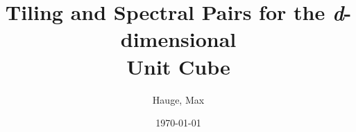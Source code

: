 
\author{Hauge, Max}


\newif\ifSINGLESUPERVISOR
\SINGLESUPERVISORfalse  %

\ifSINGLESUPERVISOR
    \newcommand{\supervisorGrammar}{Supervisor}
    \newcommand{\supervisor_A}{Grepstad, Sigrid}
\else
    \newcommand{\supervisorGrammar}{Supervisors}
    \newcommand{\supervisorA}{Grepstad, Sigrid}
    \newcommand{\supervisorB}{Heap, Winston}
\fi


\title{Tiling and Spectral Pairs for the \emph{d}-dimensional\\ Unit Cube}  %


\newcommand{\emnekode}{MA3911 — masteroppgave i matematiske fag}


\renewcommand{\NTNUinstitutt}{Institute of Mathematical Sciences}
\renewcommand{\NTNUinstituttLowerC}{institute of mathematical sciences}


\date{\today}
